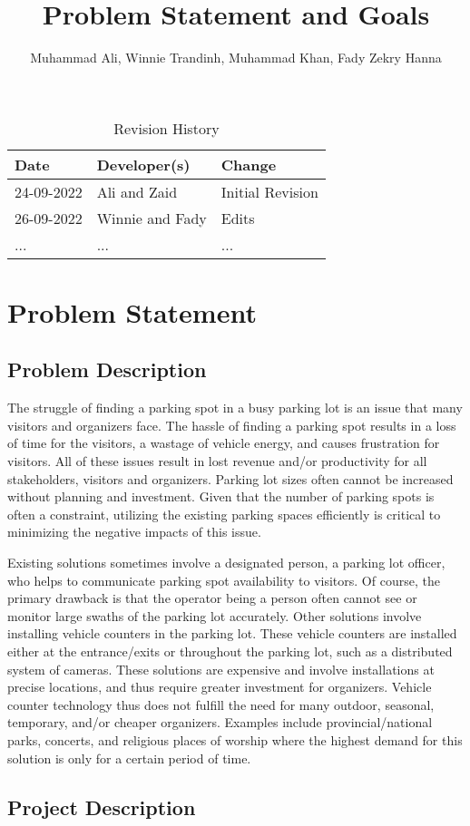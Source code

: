 \documentclass{article}
\title{Problem Statement and Goals\\\progname}
\author{\authname Muhammad Ali, Winnie Trandinh, Muhammad Khan, Fady Zekry Hanna}
\date{}
\begin{document}
\maketitle

\begin{table}[hp]
\caption{Revision History} \label{TblRevisionHistory}
\begin{tabularx}{\textwidth}{llX}
\toprule
\textbf{Date} & \textbf{Developer(s)} & \textbf{Change}\\
\midrule
24-09-2022 & Ali and Zaid & Initial Revision\\
26-09-2022 & Winnie and Fady & Edits \\
... & ... & ...\\
\bottomrule
\end{tabularx}
\end{table}

\section{Problem Statement}
\subsection{Problem Description}

\indent The struggle of finding a parking spot in a busy parking lot is an issue that many visitors and organizers face. The hassle of finding a parking spot results in a loss of time for the visitors, a wastage of vehicle energy, and causes frustration for visitors. All of these issues result in lost revenue and/or productivity for all stakeholders, visitors and organizers. Parking lot sizes often cannot be increased without planning and investment. Given that the number of parking spots is often a constraint, utilizing the existing parking spaces efficiently is critical to minimizing the negative impacts of this issue.


\indent Existing solutions sometimes involve a designated person, a parking lot officer, who helps to communicate parking spot availability to visitors. Of course, the primary drawback is that the operator being a person often cannot see or monitor large swaths of the parking lot accurately. Other solutions involve installing vehicle counters in the parking lot. These vehicle counters are installed either at the entrance/exits or throughout the parking lot, such as a distributed system of cameras.  These solutions are expensive and involve installations at precise locations, and thus require greater investment for organizers. Vehicle counter technology thus does not fulfill the need for many outdoor, seasonal, temporary, and/or cheaper organizers.  Examples include provincial/national parks, concerts, and religious places of worship where the highest demand for this solution is only for a certain period of time. 
\subsection{Project Description}
\end{document}
